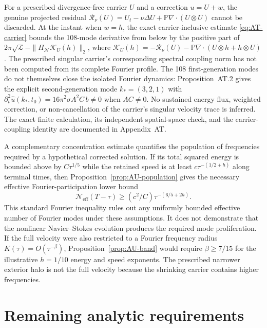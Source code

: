 \documentclass[11pt,a4paper]{article}
\theoremstyle{plain}
\theoremstyle{definition}
\begin{document}
For a prescribed divergence-free carrier $U$ and a correction
$u=U+w$, the genuine projected residual
$\mathcal R_\nu(U)=U_t-\nu\Delta U+
\mathbb P\nabla\cdot(U\otimes U)$ cannot be discarded.
At the instant when $w=h$, the exact carrier-inclusive estimate
\eqref{eq:AT-carrier} bounds the 108-mode derivative from below
by the positive part of
$2\pi\sqrt{\mathcal L}-\|\Pi_{\mathcal N}\mathcal K_U(h)\|_2$,
where
$\mathcal K_U(h)=-\mathcal R_\nu(U)
-\mathbb P\nabla\cdot(U\otimes h+h\otimes U)$.
The prescribed singular carrier's corresponding spectral
coupling norm has not been computed from its complete Fourier profile.
The 108 first-generation modes do not themselves close the
isolated Fourier dynamics: Proposition~AT.2 gives the explicit
second-generation mode $k_*=(3,2,1)$ with
$\partial_t^2\widehat u(k_*,t_0)
=16\pi^2\sigma A^2C\,b\ne0$ when $AC\ne0$.
No sustained energy flux, weighted correction, or non-cancellation
of the carrier's singular velocity trace is inferred. The exact finite
calculation, its independent spatial-space check, and the
carrier-coupling identity are documented in Appendix~AT.

A complementary concentration estimate quantifies the population of
frequencies required by a hypothetical corrected solution. If its
total squared energy is bounded above by $C\tau^{1/5}$ while the
retained speed is at least $c\tau^{-(1/2+h)}$ along terminal times,
then Proposition~\ref{prop:AU-population} gives the necessary
effective Fourier-participation lower bound
\begin{equation}\label{eq:main-population}
 \mathcal N_{\mathrm{eff}}(T-\tau)
 \ge (c^2/C)\tau^{-(6/5+2h)}.
\end{equation}
This standard Fourier inequality rules out any uniformly bounded
effective number of Fourier modes under these assumptions.
It does not demonstrate that the nonlinear Navier--Stokes evolution
produces the required mode proliferation. If the full velocity were
also restricted to a Fourier frequency radius
$K(\tau)=O(\tau^{-\beta})$, Proposition~\ref{prop:AU-band}
would require $\beta\ge7/15$ for the illustrative $h=1/10$
energy and speed exponents. The prescribed narrower exterior
halo is not the full velocity because the shrinking carrier
contains higher frequencies.

\section{Remaining analytic requirements}
\end{document}
